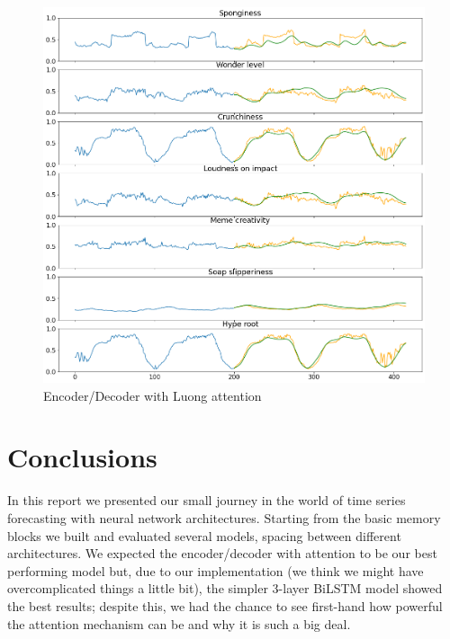 \documentclass[10.5pt,a4paper,twocolumn]{article}
\begin{document}
\begin{figure}[h]
    \centering
    \includegraphics[width=\linewidth]{pics/pred_attention.png}
    \caption{Encoder/Decoder with Luong attention}
\end{figure}

\section{Conclusions}
In this report we presented our small journey in the world of time series forecasting with 
neural network architectures. Starting from the basic memory blocks we built and evaluated 
several models, spacing between different architectures.
We expected the encoder/decoder with attention to be our best performing model but,
due to our implementation (we think we might have overcomplicated things a little bit),
the simpler 3-layer BiLSTM model showed the best results; despite this, we had the chance to 
see first-hand how powerful the attention mechanism can be and why it is such a big deal.

\newpage
\end{document}
